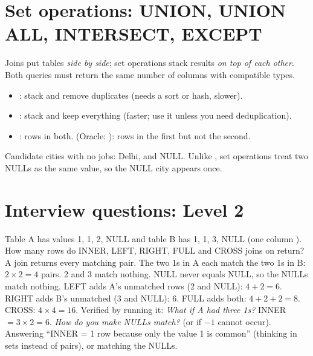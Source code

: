 \section{Set operations: UNION, UNION ALL, INTERSECT, EXCEPT}
Joins put tables \emph{side by side}; set operations stack results \emph{on top of each other}. Both queries must return the same number of columns with
compatible types.
\begin{itemize}
\item {}: stack and remove duplicates (needs a sort or hash, slower).
\item {}: stack and keep everything (faster; use it unless you need deduplication).
\item {}: rows in both.  (Oracle: ): rows in the first but not the second.
\end{itemize}
Candidate cities with no jobs: Delhi, and NULL. Unlike \code{=}, set operations treat two NULLs as the same value, so the NULL city appears once.

\section{Interview questions: Level 2}

\begin{qa}{\classic Table A has values 1, 1, 2, NULL and table B has 1, 1, 3, NULL (one column ). How many rows do INNER, LEFT, RIGHT, FULL and
CROSS joins on  return?}
\why A join returns every matching pair. The two 1s in A each match the two 1s in B: $2 \times 2 = 4$ pairs. 2 and 3 match nothing. NULL never equals
NULL, so the NULLs match nothing. LEFT adds A's unmatched rows (2 and NULL): $4 + 2 = 6$. RIGHT adds B's unmatched (3 and NULL): 6. FULL adds both: $4 + 2
+ 2 = 8$. CROSS: $4 \times 4 = 16$.
\worked Verified by running it:
\pushes \emph{What if A had three 1s?} INNER $= 3 \times 2 = 6$. \emph{How do you make NULLs match?}  (or
 if $-1$ cannot occur).
\pitfall Answering ``INNER = 1 row because only the value 1 is common'' (thinking in sets instead of pairs), or matching the NULLs.
\end{qa}


